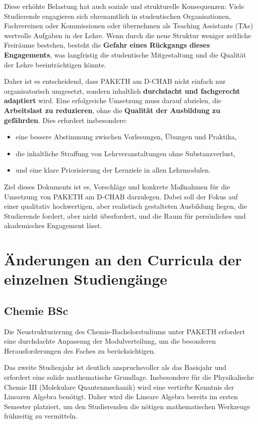 \documentclass[a4paper]{article}
\begin{document}
Diese erhöhte Belastung hat auch soziale und strukturelle Konsequenzen:  
Viele Studierende engagieren sich ehrenamtlich in studentischen Organisationen, Fachvereinen oder Kommissionen oder übernehmen als Teaching Assistants (TAs) wertvolle Aufgaben in der Lehre.  
Wenn durch die neue Struktur weniger zeitliche Freiräume bestehen, besteht die \textbf{Gefahr eines Rückgangs dieses Engagements}, was langfristig die studentische Mitgestaltung und die Qualität der Lehre beeinträchtigen könnte.  

Daher ist es entscheidend, dass PAKETH am D-CHAB nicht einfach nur organisatorisch umgesetzt, sondern inhaltlich \textbf{durchdacht und fachgerecht adaptiert} wird.  
Eine erfolgreiche Umsetzung muss darauf abzielen, die \textbf{Arbeitslast zu reduzieren}, ohne die \textbf{Qualität der Ausbildung zu gefährden}.  
Dies erfordert insbesondere:
\begin{itemize}[leftmargin=2em]
    \item eine bessere Abstimmung zwischen Vorlesungen, Übungen und Praktika,
    \item die inhaltliche Straffung von Lehrveranstaltungen ohne Substanzverlust,
    \item und eine klare Priorisierung der Lernziele in allen Lehrmodulen.
\end{itemize}

Ziel dieses Dokuments ist es, Vorschläge und konkrete Maßnahmen für die Umsetzung von PAKETH am D-CHAB darzulegen.  
Dabei soll der Fokus auf einer qualitativ hochwertigen, aber realistisch gestalteten Ausbildung liegen, die Studierende fordert, aber nicht überfordert, und die Raum für persönliches und akademisches Engagement lässt.

\section{Änderungen an den Curricula der einzelnen Studiengänge}

\subsection{Chemie BSc}

Die Neustrukturierung des Chemie-Bachelorstudiums unter PAKETH erfordert eine durchdachte Anpassung der Modulverteilung, um die besonderen Herausforderungen des Faches zu berücksichtigen.

Das zweite Studienjahr ist deutlich anspruchsvoller als das Basisjahr und erfordert eine solide mathematische Grundlage. Insbesondere für die Physikalische Chemie III (Molekulare Quantenmechanik) wird eine vertiefte Kenntnis der Linearen Algebra benötigt. Daher wird die Lineare Algebra bereits im ersten Semester platziert, um den Studierenden die nötigen mathematischen Werkzeuge frühzeitig zu vermitteln.
\end{document}
